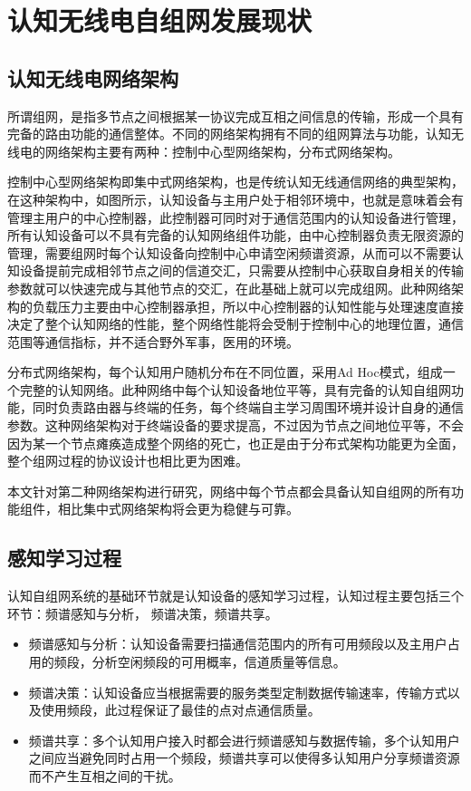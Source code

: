 \documentclass[a4paper,AutoFakeBold,oneside,12pt]{book}
\begin{document}
\section{认知无线电自组网发展现状}
\subsection{认知无线电网络架构}
  所谓组网，是指多节点之间根据某一协议完成互相之间信息的传输，形成一个具有完备的路由功能的通信整体。不同的网络架构拥有不同的组网算法与功能，认知无线电的网络架构主要有两种：控制中心型网络架构，分布式网络架构。
  
  控制中心型网络架构即集中式网络架构，也是传统认知无线通信网络的典型架构，在这种架构中，如图所示，认知设备与主用户处于相邻环境中，也就是意味着会有管理主用户的中心控制器，此控制器可同时对于通信范围内的认知设备进行管理，所有认知设备可以不具有完备的认知网络组件功能，由中心控制器负责无限资源的管理，需要组网时每个认知设备向控制中心申请空闲频谱资源，从而可以不需要认知设备提前完成相邻节点之间的信道交汇，只需要从控制中心获取自身相关的传输参数就可以快速完成与其他节点的交汇，在此基础上就可以完成组网。此种网络架构的负载压力主要由中心控制器承担，所以中心控制器的认知性能与处理速度直接决定了整个认知网络的性能，整个网络性能将会受制于控制中心的地理位置，通信范围等通信指标，并不适合野外军事，医用的环境。


  分布式网络架构，每个认知用户随机分布在不同位置，采用Ad Hoc模式，组成一个完整的认知网络。此种网络中每个认知设备地位平等，具有完备的认知自组网功能，同时负责路由器与终端的任务，每个终端自主学习周围环境并设计自身的通信参数。这种网络架构对于终端设备的要求提高，不过因为节点之间地位平等，不会因为某一个节点瘫痪造成整个网络的死亡，也正是由于分布式架构功能更为全面，整个组网过程的协议设计也相比更为困难。


  本文针对第二种网络架构进行研究，网络中每个节点都会具备认知自组网的所有功能组件，相比集中式网络架构将会更为稳健与可靠。

\subsection{感知学习过程}
  认知自组网系统的基础环节就是认知设备的感知学习过程，认知过程主要包括三个环节：频谱感知与分析， 频谱决策，频谱共享。
\begin{itemize}%
  \item 频谱感知与分析：认知设备需要扫描通信范围内的所有可用频段以及主用户占用的频段，分析空闲频段的可用概率，信道质量等信息。

  \item 频谱决策：认知设备应当根据需要的服务类型定制数据传输速率，传输方式以及使用频段，此过程保证了最佳的点对点通信质量。

  \item 频谱共享：多个认知用户接入时都会进行频谱感知与数据传输，多个认知用户之间应当避免同时占用一个频段，频谱共享可以使得多认知用户分享频谱资源而不产生互相之间的干扰。
 \end{itemize}
\end{document}
